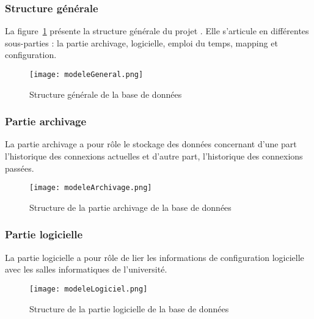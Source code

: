\begin{appendices}
\begin{itemize}
\end{itemize}


\subsubsection{Structure g\'en\'erale}

La figure~\ref{annexe:modeleGeneral} pr\'esente la structure g\'en\'erale du projet \YuukouII.
Elle s'articule en diff\'erentes sous-parties : la partie archivage, logicielle, emploi du temps, mapping et configuration.

\clearpage

\begin{figure}[!ht]
	\centering
	\texttt{[image: modeleGeneral.png]}
	\caption{Structure g\'en\'erale de la base de donn\'ees}
	\label{annexe:modeleGeneral}

\end{figure}

\clearpage

\subsubsection{Partie archivage}

La partie archivage a pour r\^ole le stockage des donn\'ees concernant d'une part l'historique des connexions actuelles et d'autre part, l'historique des connexions pass\'ees.

\begin{figure}[!ht]
	\centering
	\texttt{[image: modeleArchivage.png]}
	\caption{Structure de la partie archivage de la base de donn\'ees}
	\label{annexe:modeleArchivage}

\end{figure}


\subsubsection{Partie logicielle}

La partie logicielle a pour r\^ole de lier les informations de configuration logicielle avec les salles informatiques de l'universit\'e.

\clearpage

\begin{figure}[!ht]
	\centering
	\texttt{[image: modeleLogiciel.png]}
	\caption{Structure de la partie logicielle de la base de donn\'ees}
	\label{annexe:modeleLogiciel}

\end{figure}



\end{appendices}
